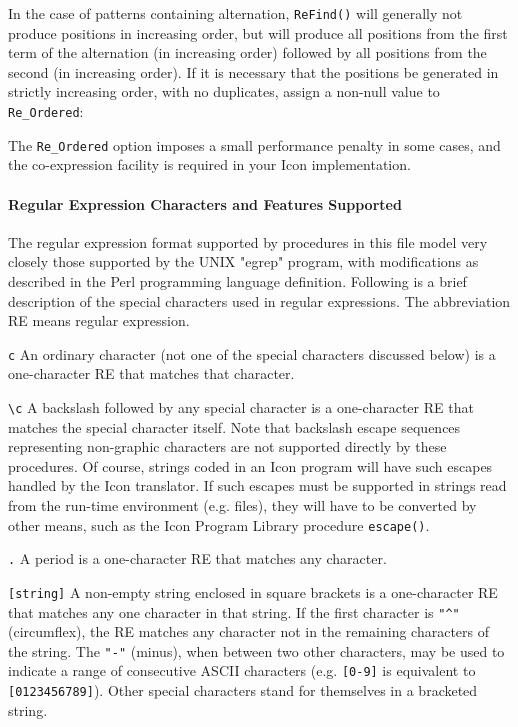 
In the case of patterns containing alternation, \texttt{ReFind()} will
generally not produce positions in increasing order, but will produce
all positions from the first term of the alternation (in increasing
order) followed by all positions from the second (in increasing order).
If it is necessary that the positions be generated in strictly
increasing order, with no duplicates, assign a non-null value to
\texttt{Re\_Ordered}:


The \texttt{Re\_Ordered} option imposes a small performance penalty in
some cases, and the co-expression facility is required in your Icon
implementation.

\paragraph{Regular Expression Characters and Features Supported}
The regular expression format supported by procedures in this file model
very closely those supported by the UNIX
"egrep" program, with modifications as
described in the Perl programming language definition. Following is a
brief description of the special characters used in regular
expressions. The abbreviation RE means regular expression.

\texttt{c} An ordinary character (not one of the special characters
discussed below) is a one-character RE that matches that character.

\texttt{{\textbackslash}c} A backslash followed by any special character
is a one-character RE that matches the special character itself. Note
that backslash escape sequences representing non-graphic characters are
not supported directly by these procedures. Of course, strings coded in
an Icon program will have such escapes handled by the Icon translator.
If such escapes must be supported in strings read from the run-time
environment (e.g. files), they will have to be converted by other
means, such as the Icon Program Library procedure \texttt{escape()}.

\texttt{.} A period is a one-character RE that matches any character.

\texttt{[string]} A non-empty string enclosed in square brackets is a
one-character RE that matches any one character in that string. If the
first character is \texttt{"\^{}"}
(circumflex), the RE matches any character not in the remaining
characters of the string. The \texttt{"-"}
(minus), when between two other characters, may be used to indicate a
range of consecutive ASCII characters (e.g. \texttt{[0-9]}
is equivalent to \texttt{[0123456789]}). Other special characters stand
for themselves in a bracketed string.

